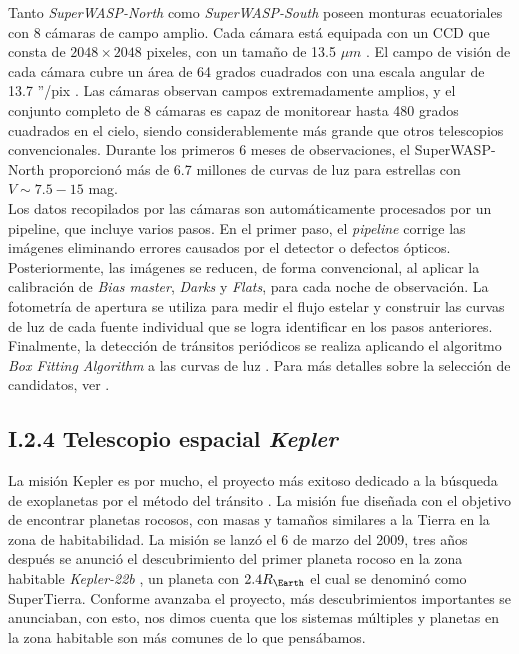 Tanto \textit{SuperWASP-North} como \textit{SuperWASP-South} poseen monturas ecuatoriales con 8 cámaras de campo amplio. Cada cámara está equipada con un CCD que consta de $2048\times 2048$ pixeles, con un tamaño de 13.5 $	\mu m$ . El campo de visión de cada cámara cubre un área de 64 grados cuadrados con una escala angular de 13.7 ''/pix . Las cámaras observan campos extremadamente amplios, y el conjunto completo de 8 cámaras es capaz de monitorear hasta 480 grados cuadrados en el cielo, siendo considerablemente más grande que otros telescopios convencionales. Durante los primeros 6 meses de observaciones, el SuperWASP-North proporcionó más de 6.7 millones de curvas de luz para estrellas con $V \sim 7.5-15$ mag.\\


Los datos recopilados por las cámaras son automáticamente procesados por un pipeline, que incluye varios pasos. En el primer paso, el \textit{pipeline} corrige las imágenes eliminando errores causados por el detector o defectos ópticos. Posteriormente, las imágenes se reducen, de forma convencional, al aplicar la calibración de \textit{Bias master}, \textit{Darks} y \textit{Flats}, para cada noche de observación. La fotometría de apertura se utiliza para medir el flujo estelar y construir las curvas de luz de cada fuente individual que se logra identificar en los pasos anteriores. Finalmente, la detección de tránsitos periódicos se realiza aplicando el algoritmo \textit{Box Fitting Algorithm} a las curvas de luz \citep{kovacs2002box}. Para más detalles sobre la selección de candidatos, ver \cite{collier2006fast}.\\

\subsection*{I.2.4 Telescopio espacial \textit{Kepler}}

La misión Kepler es por mucho, el proyecto más exitoso dedicado a la búsqueda de exoplanetas por el método del tránsito \cite{borucki2010kepler}. La misión fue diseñada con el objetivo de encontrar planetas rocosos, con masas y tamaños similares a la Tierra en la zona de habitabilidad. La misión se lanzó el 6 de marzo del 2009, tres años después se
anunció el descubrimiento del primer planeta rocoso en la zona habitable \textit{Kepler-22b} \cite{borucki2012kepler}, un planeta con $2.4R_{\Earth}$ el cual se denominó como SuperTierra. Conforme avanzaba el proyecto, más descubrimientos importantes se anunciaban, con esto, nos dimos cuenta que los sistemas múltiples y planetas en la zona habitable son más comunes de lo que pensábamos.\\

